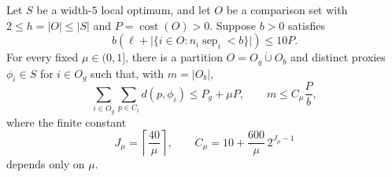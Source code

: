 \begin{theorem}[Anchoring]
\label{loc:anchoring}
Let $S$ be a width-$5$ local optimum, and let $O$ be a comparison set
with $2\le h=|O|\le|S|$ and $P=\operatorname{cost}(O)>0$.  Suppose $b>0$
satisfies
\begin{equation}
 b\left(\ell+
   \bigl|\{i\in O:n_i\operatorname{sep}_i<b\}\bigr|\right)
 \le10P.
 \label{loc:scale-condition}
\end{equation}
For every fixed $\mu\in(0,1]$, there is a partition
$O=O_g\mathbin{\dot\cup}O_b$ and distinct proxies $\phi_i\in S$ for
$i\in O_g$ such that, with $m=|O_b|$,
\begin{equation}
 \sum_{i\in O_g}\sum_{p\in C_i}d(p,\phi_i)
 \le P_g+\mu P,
 \qquad m\le C_\mu\frac{P}{b},
 \label{loc:anchoring-conclusion}
\end{equation}
where the finite constant
\begin{equation}
 J_\mu=\left\lceil\frac{40}{\mu}\right\rceil,
 \qquad
 C_\mu=10+\frac{600}{\mu}\,2^{J_\mu-1}
 \label{loc:anchoring-constant}
\end{equation}
depends only on $\mu$.
\end{theorem}

